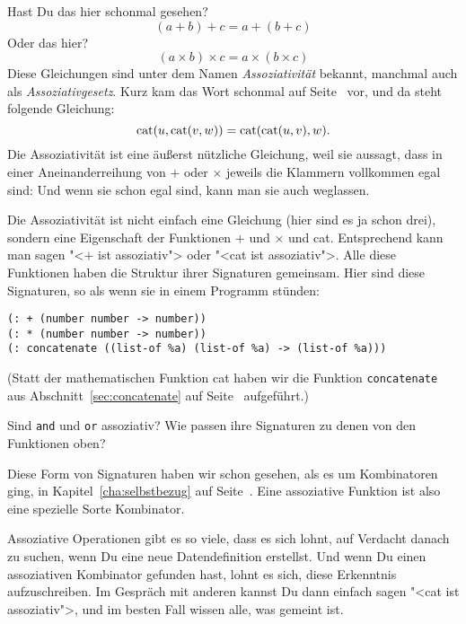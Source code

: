 Hast Du das hier schonmal gesehen?
%
\begin{displaymath}
  (a + b) + c = a + (b + c)
\end{displaymath}
%
Oder das hier?
%
\begin{displaymath}
  (a \times b) \times c = a \times (b \times c)
\end{displaymath}
%
Diese Gleichungen sind unter dem Namen
\textit{Assoziativität} bekannt, manchmal auch
als \textit{Assoziativgesetz}.  Kurz kam das Wort schonmal auf
Seite~\pageref{page:assoziativitaet} vor, und da steht folgende Gleichung:
%
\begin{displaymath}
  {\rm cat}(u,{\rm cat}(v,w))  = {\rm cat}({\rm cat}(u,v),w).
\end{displaymath}
%
Die Assoziativität ist eine äußerst nützliche Gleichung, weil sie
aussagt, dass in einer Aneinanderreihung von $+$ oder $\times$ jeweils
die Klammern vollkommen egal sind: Und wenn sie schon egal sind, kann
man sie auch weglassen.

Die Assoziativität ist nicht einfach eine Gleichung (hier sind es ja
schon drei), sondern eine Eigenschaft
der Funktionen $+$ und
$\times$ und cat.  Entsprechend kann man sagen "<$+$ ist
assoziativ"> oder "<cat ist assoziativ">.  Alle diese Funktionen haben die Struktur
ihrer Signaturen gemeinsam.  Hier sind diese Signaturen, so als wenn sie in
einem Programm stünden:
%
\begin{lstlisting}
(: + (number number -> number))
(: * (number number -> number))
(: concatenate ((list-of %a) (list-of %a) -> (list-of %a)))
\end{lstlisting}
%
(Statt der mathematischen Funktion cat haben wir die Funktion
\lstinline{concatenate} aus Abschnitt~\ref{sec:concatenate} auf
Seite~\pageref{sec:concatenate} aufgeführt.)
%
\begin{aufgabeinline}
  Sind \lstinline{and} und \lstinline{or} assoziativ?  Wie passen ihre
  Signaturen zu denen von den Funktionen oben?
\end{aufgabeinline}
%
Diese Form von Signaturen haben wir schon gesehen, als es um
Kombinatoren ging, in Kapitel~\ref{cha:selbstbezug} auf
Seite~\pageref{cha:selbstbezug}.  Eine assoziative Funktion ist also
eine spezielle Sorte Kombinator.

Assoziative Operationen gibt es so viele, dass es sich lohnt, auf
Verdacht danach zu suchen, wenn Du eine neue Datendefinition
erstellst.  Und wenn Du einen assoziativen Kombinator gefunden hast,
lohnt es sich, diese Erkenntnis aufzuschreiben.  Im Gespräch mit
anderen kannst Du dann einfach sagen "<cat ist assoziativ">, und im
besten Fall wissen alle, was gemeint ist.

